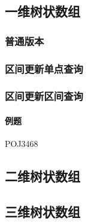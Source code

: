 \subsection{一维树状数组}

\subsubsection{普通版本}


\subsubsection{区间更新单点查询}


\subsubsection{区间更新区间查询}

\paragraph{例题} POJ3468



\subsection{二维树状数组}


\subsection{三维树状数组}

